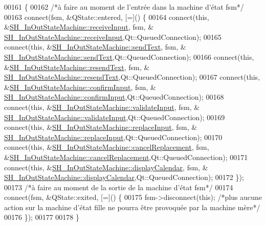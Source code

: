 \begin{DoxyCode}
00161 \{
00162     \textcolor{comment}{/*à faire au moment de l'entrée dans la machine d'état fsm*/}
00163     connect(fsm, &QState::entered, [=]() \{
00164         connect(\textcolor{keyword}{this}, &\hyperlink{classSH__InOutStateMachine_a037ed5e13ecfae2123a8d4940292e410}{SH\_InOutStateMachine::receiveInput}, fsm, &
      \hyperlink{classSH__InOutStateMachine_a037ed5e13ecfae2123a8d4940292e410}{SH\_InOutStateMachine::receiveInput},Qt::QueuedConnection);
00165         connect(\textcolor{keyword}{this}, &\hyperlink{classSH__InOutStateMachine_a5e7f5958bae31696b6a8deab94ad2b4f}{SH\_InOutStateMachine::sendText}, fsm, &
      \hyperlink{classSH__InOutStateMachine_a5e7f5958bae31696b6a8deab94ad2b4f}{SH\_InOutStateMachine::sendText},Qt::QueuedConnection);
00166         connect(\textcolor{keyword}{this}, &\hyperlink{classSH__InOutStateMachine_a526822c66b46aa0cd81ba4473fa5573f}{SH\_InOutStateMachine::resendText}, fsm, &
      \hyperlink{classSH__InOutStateMachine_a526822c66b46aa0cd81ba4473fa5573f}{SH\_InOutStateMachine::resendText},Qt::QueuedConnection);
00167         connect(\textcolor{keyword}{this}, &\hyperlink{classSH__InOutStateMachine_a7f7d9c9300c1d05bce2c26029f28cc31}{SH\_InOutStateMachine::confirmInput}, fsm, &
      \hyperlink{classSH__InOutStateMachine_a7f7d9c9300c1d05bce2c26029f28cc31}{SH\_InOutStateMachine::confirmInput},Qt::QueuedConnection);
00168         connect(\textcolor{keyword}{this}, &\hyperlink{classSH__InOutStateMachine_aec1b3fef3c1f82499aa1f73beaecd08a}{SH\_InOutStateMachine::validateInput}, fsm, &
      \hyperlink{classSH__InOutStateMachine_aec1b3fef3c1f82499aa1f73beaecd08a}{SH\_InOutStateMachine::validateInput},Qt::QueuedConnection);
00169         connect(\textcolor{keyword}{this}, &\hyperlink{classSH__InOutStateMachine_a9fa5db44086de2576c812f631aa4f60a}{SH\_InOutStateMachine::replaceInput}, fsm, &
      \hyperlink{classSH__InOutStateMachine_a9fa5db44086de2576c812f631aa4f60a}{SH\_InOutStateMachine::replaceInput},Qt::QueuedConnection);
00170         connect(\textcolor{keyword}{this}, &\hyperlink{classSH__InOutStateMachine_a035d37535533d4805fe2606f38c19380}{SH\_InOutStateMachine::cancelReplacement}, fsm,
       &\hyperlink{classSH__InOutStateMachine_a035d37535533d4805fe2606f38c19380}{SH\_InOutStateMachine::cancelReplacement},Qt::QueuedConnection);
00171         connect(\textcolor{keyword}{this}, &\hyperlink{classSH__InOutStateMachine_ab3a12d1f9b658d8ffdc17669a6c065f2}{SH\_InOutStateMachine::displayCalendar}, fsm, &
      \hyperlink{classSH__InOutStateMachine_ab3a12d1f9b658d8ffdc17669a6c065f2}{SH\_InOutStateMachine::displayCalendar},Qt::QueuedConnection);
00172     \});
00173     \textcolor{comment}{/*à faire au moment de la sortie de la machine d'état fsm*/}
00174     connect(fsm, &QState::exited, [=]() \{
00175         fsm->disconnect(\textcolor{keyword}{this}); \textcolor{comment}{/*plus aucune action sur la machine d'état fille ne pourra être provoquée
       par la machine mère*/}
00176     \});
00177 
00178 \}
\end{DoxyCode}
